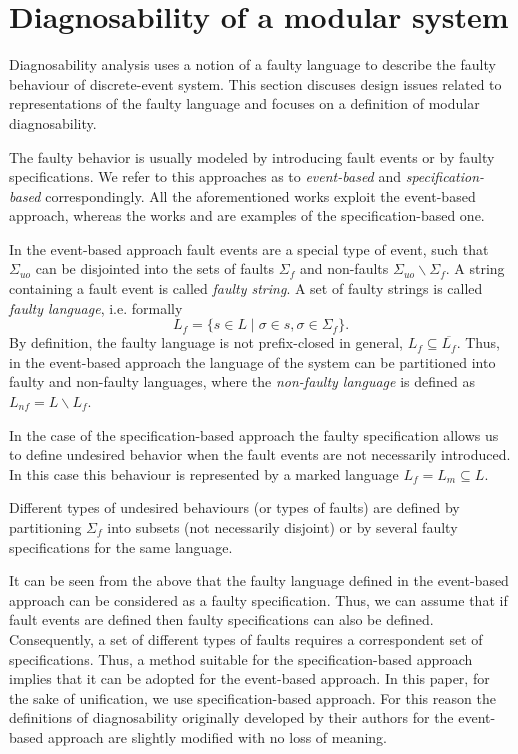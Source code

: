 \documentclass[a4paper, 10pt, conference]{ieeeconf}
\begin{document}
\section{Diagnosability of a modular system}
\label{sec:Diagnosability}
Diagnosability analysis uses a notion of a faulty language to describe the
faulty behaviour of discrete-event system. This section discuses design issues
related to representations of the faulty language and focuses on a definition
of modular diagnosability.

The faulty behavior is usually modeled by introducing fault events or by faulty
specifications. We refer to this approaches as to \emph{event-based} and
\emph{specification-based} correspondingly. All the aforementioned works exploit
the event-based approach, whereas the works \cite{zhou_decentralized_2008} and
\cite{sartini_methodology_2010} are examples of the specification-based one.

In the event-based approach fault events are a special type of event, such that
$\Sigma_{uo}$ can be disjointed into the sets of faults $\Sigma_f$ and
non-faults $\Sigma_{uo}\backslash \Sigma_f$. A string containing a fault event
is called \emph{faulty string}. A set of faulty strings is called \emph{faulty
language}, i.e. formally $$L_f = \{ s \in L \mid \sigma \in s, \sigma \in
\Sigma_f\}.$$ By definition, the faulty language is not prefix-closed in
general, $L_f \subseteq \overline{L_f}$. Thus, in the event-based approach the
language of the system can be partitioned into faulty and non-faulty languages,
where the \emph{non-faulty language} is defined as $L_{nf} = L \backslash L_f$.

In the case of the specification-based approach the faulty specification allows
us to define undesired behavior when the fault events are not necessarily
introduced. In this case this behaviour is represented by a marked language $L_f
= L_m \subseteq L$. 

Different types of undesired behaviours (or types of faults) are defined by
partitioning $\Sigma_f$ into subsets (not necessarily disjoint) or by several
faulty specifications for the same language. 

It can be seen from the above that the faulty language defined in the
event-based approach can be considered as a faulty specification. Thus, we can
assume that if fault events are defined then faulty specifications can also be
defined. Consequently, a set of different types of faults requires a
correspondent set of specifications. Thus, a method suitable for the
specification-based approach implies that it can be adopted for the event-based
approach. In this paper, for the sake of unification, we use specification-based
approach. For this reason the definitions of diagnosability originally developed
by their authors for the event-based approach are slightly modified with no loss
of meaning. 
\end{document}
